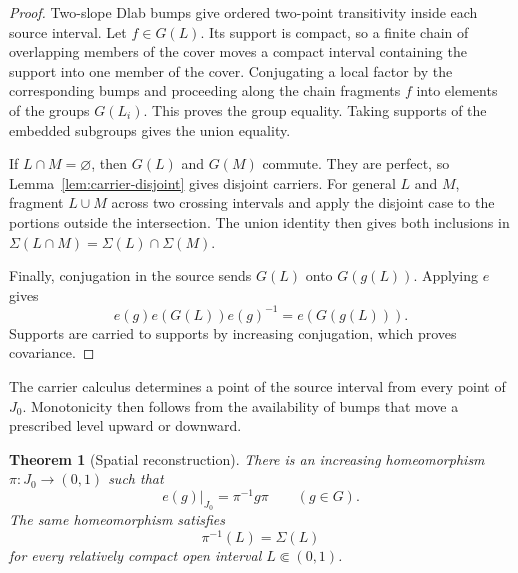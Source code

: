 \documentclass[11pt]{amsart}
\newtheorem{theorem}{Theorem}[section]
\theoremstyle{definition}
\theoremstyle{remark}
\numberwithin{equation}{section}
\begin{document}
\begin{proof}
Two-slope Dlab bumps give ordered two-point transitivity inside each source interval. Let \(f\in G(L)\). Its support is compact, so a finite chain of overlapping members of the cover moves a compact interval containing the support into one member of the cover. Conjugating a local factor by the corresponding bumps and proceeding along the chain fragments \(f\) into elements of the groups \(G(L_i)\). This proves the group equality. Taking supports of the embedded subgroups gives the union equality.

If \(L\cap M=\varnothing\), then \(G(L)\) and \(G(M)\) commute. They are perfect, so Lemma~\ref{lem:carrier-disjoint} gives disjoint carriers. For general \(L\) and \(M\), fragment \(L\cup M\) across two crossing intervals and apply the disjoint case to the portions outside the intersection. The union identity then gives both inclusions in
\(\Sigma(L\cap M)=\Sigma(L)\cap\Sigma(M)\).

Finally, conjugation in the source sends \(G(L)\) onto \(G(g(L))\). Applying \(e\) gives
\[
e(g)e(G(L))e(g)^{-1}=e(G(g(L))).
\]
Supports are carried to supports by increasing conjugation, which proves covariance.
\end{proof}

The carrier calculus determines a point of the source interval from every point of \(J_0\). Monotonicity then follows from the availability of bumps that move a prescribed level upward or downward.

\begin{theorem}[Spatial reconstruction]
\label{thm:spatial}
There is an increasing homeomorphism \(\pi:J_0\to(0,1)\) such that
\[
e(g)|_{J_0}=\pi^{-1}g\pi
\qquad(g\in G).
\]
The same homeomorphism satisfies
\[
\pi^{-1}(L)=\Sigma(L)
\]
for every relatively compact open interval \(L\Subset(0,1)\).
\end{theorem}
\end{document}
